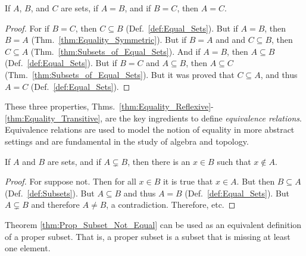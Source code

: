         \begin{theorem}
            \label{thm:Equality_Transitive}%
            If $A$, $B$, and $C$ are sets, if $A=B$, and if $B=C$, then $A=C$.
        \end{theorem}
        \begin{proof}
            For if $B=C$, then $C\subseteq{B}$ (Def.~\ref{def:Equal_Sets}). But
            if $A=B$, then $B=A$ (Thm.~\ref{thm:Equality_Symmetric}). But if
            $B=A$ and and $C\subseteq{B}$, then $C\subseteq{A}$
            (Thm.~\ref{thm:Subsets_of_Equal_Sets}). And if $A=B$, then
            $A\subseteq{B}$ (Def.~\ref{def:Equal_Sets}). But if $B=C$ and
            $A\subseteq{B}$, then $A\subseteq{C}$
            (Thm.~\ref{thm:Subsets_of_Equal_Sets}). But it was proved that
            $C\subseteq{A}$, and thus $A=C$ (Def.~\ref{def:Equal_Sets}).
        \end{proof}
        These three properties,
        Thms.~\ref{thm:Equality_Reflexive}-%
        \ref{thm:Equality_Transitive}, are the key ingredients to define
        \textit{equivalence relations}. Equivalence relations are used to model
        the notion of equality in more abstract settings and are fundamental in
        the study of algebra and topology.
        \begin{theorem}
            \label{thm:Prop_Subset_Not_Equal}%
            If $A$ and $B$ are sets, and if $A\subsetneq{B}$, then there is an
            $x\in{B}$ such that $x\notin{A}$.
        \end{theorem}
        \begin{proof}
            For suppose not. Then for all $x\in{B}$ it is true that $x\in{A}$.
            But then $B\subseteq{A}$ (Def.~\ref{def:Subsets}).
            But $A\subseteq{B}$ and thus $A=B$ (Def.~\ref{def:Equal_Sets}).
            But $A\subsetneq{B}$ and therefore $A\ne{B}$, a contradiction.
            Therefore, etc.
        \end{proof}
        Theorem \ref{thm:Prop_Subset_Not_Equal} can be used as an equivalent
        definition of a proper subset. That is, a proper subset is a subset that
        is missing at least one element.
